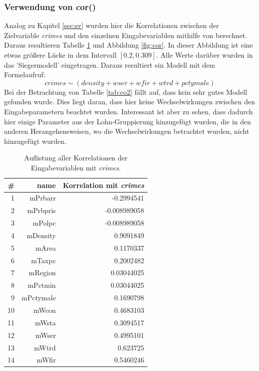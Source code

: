 \subsubsection{Verwendung von cor()}
Analog zu Kapitel \ref{sec:sv} wurden hier die Korrelationen zwischen der Zielvariable \textit{crimes} und den einzelnen Eingabevariablen mithilfe von  berechnet.
Daraus resultieren Tabelle \ref{tab:cor} und Abbildung \ref{fig:cor}.
In dieser Abbildung ist eine etwas gr\"o\ss{}ere L\"ucke in dem Intervall $[0.2, 0.309]$.
Alle Werte dar\"uber wurden in das 'Siegermodell' eingetragen.
Daraus resultiert ein Modell mit dem Formelaufruf:
\begin{equation}
crimes \sim (density+wser+wfir+wtrd+pctymale)
\end{equation} 
Bei der Betrachtung von Tabelle \ref{tab:co2} f\"allt auf, dass kein sehr gutes Modell gefunden wurde.
Dies liegt daran, dass hier keine Wechselwirkungen zwischen den Eingabeparametern beachtet wurden.
Interessant ist aber zu sehen, dass dadurch hier einige Parameter aus der Lohn-Gruppierung hinzugef\"ugt wurden, die in den anderen Herangehensweisen, wo die Wechselwirkungen betrachtet wurden, nicht hinzugef\"ugt wurden.

\begin{table}[ht]
\centering
\begin{tabular}{rrr}
  \hline
  # & name & Korrelation mit \textit{crimes} \\ 
  \hline
  1 & mPrbarr & -0.2994541\\ 
  2 & mPrbpris & -0.008989058 \\ 
  3 & mPolpc & -0.008989058\\ 
  4 & mDensity & 0.9091849\\ 
  5 & mArea & 0.1170337\\ 
  6 & mTaxpc &  0.2002482\\ 
  7 & mRegion & 0.03044025\\ 
  8 & mPctmin & 0.03044025\\ 
  9 & mPctymale & 0.1690798\\ 
  10 & mWcon & 0.4683103\\ 
  11 & mWsta & 0.3094517\\ 
  12 & mWser & 0.4995101\\ 
  13 & mWtrd & 0.623725\\ 
  14 & mWfir & 0.5460246\\ 
   \hline
\end{tabular}
\caption[Auflistung aller Korrelationen]{Auflistung aller Korrelationen der Eingabevariablen mit \textit{crimes}.}
\label{tab:cor}
\end{table}

